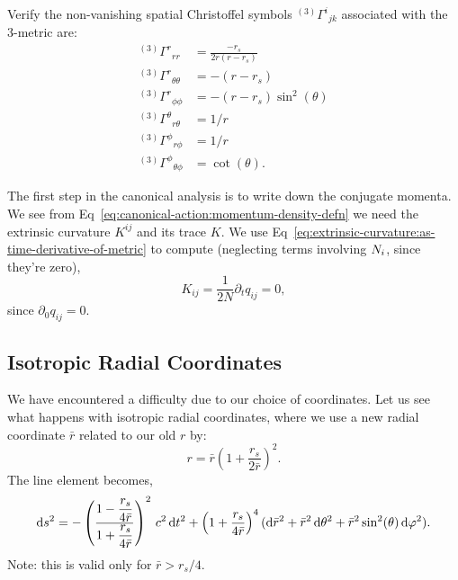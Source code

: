 \begin{exercise}
Verify the non-vanishing spatial Christoffel symbols ${}^{(3)}{\Gamma^{i}}_{jk}$
associated with the 3-metric are:
\begin{subequations}
\begin{align}
{}^{(3)}{\Gamma^{r}}_{rr} &= \frac{-r_{s}}{2r(r-r_{s})}\\
{}^{(3)}{\Gamma^{r}}_{\theta\theta} &= -(r-r_{s})\\
{}^{(3)}{\Gamma^{r}}_{\phi\phi} &= -(r-r_{s})\sin^{2}(\theta)\\
{}^{(3)}{\Gamma^{\theta}}_{r\theta} &= 1/r\\
{}^{(3)}{\Gamma^{\phi}}_{r\phi} &= 1/r\\
{}^{(3)}{\Gamma^{\phi}}_{\theta\phi} &= \cot(\theta).
\end{align}
\end{subequations}
\end{exercise}

The first step in the canonical analysis is to write down the conjugate
momenta. We see from Eq~\eqref{eq:canonical-action:momentum-density-defn}
we need the extrinsic curvature $K^{ij}$ and its trace $K$.
We use Eq~\eqref{eq:extrinsic-curvature:as-time-derivative-of-metric}
to compute (neglecting terms involving $N_{i}$, since they're zero),
\begin{equation}
K_{ij} = \frac{1}{2N}\partial_{t}q_{ij} = 0,
\end{equation}
since $\partial_{0}q_{ij}=0$.

\subsection{Isotropic Radial Coordinates}

We have encountered a difficulty due to our choice of coordinates. Let
us see what happens with isotropic radial coordinates, where we use a
new radial coordinate $\bar{r}$ related to our old $r$ by:
\begin{equation}
r = \bar{r}\left(1 + \frac{r_{s}}{2\bar{r}}\right)^{2}.
\end{equation}
The line element becomes,
\begin{equation}
\mathrm{d} s^{2} = -\left(\frac{\displaystyle 1 - \frac{r_{s}}{4\bar{r}}}{\displaystyle 1 + \frac{r_{s}}{4\bar{r}}}\right)^{2}\,c^{2}\,\mathrm{d} t^{2} +
\left(1 + \frac{r_{s}}{4\bar{r}}\right)^{4}(\mathrm{d}\bar{r}^{2} +\bar{r}^{2}\,\mathrm{d}\theta^{2}+\bar{r}^{2}\sin^{2}(\theta)\,\mathrm{d}\varphi^{2}).
\end{equation}
Note: this is valid only for $\bar{r}>r_{s}/4$.

